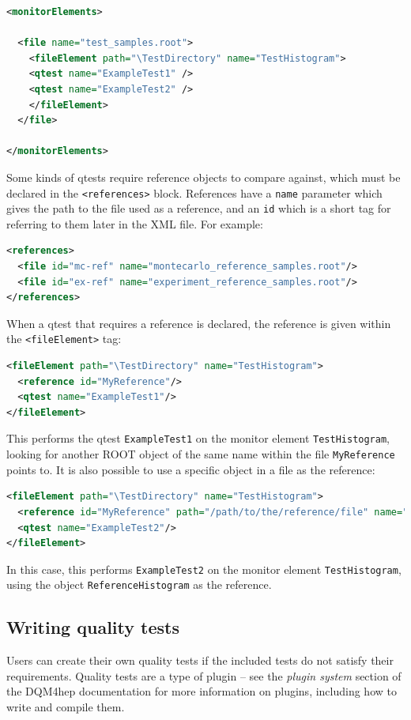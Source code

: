 \begin{lstlisting}[language=XML]
<monitorElements>

  <file name="test_samples.root">
    <fileElement path="\TestDirectory" name="TestHistogram">
    <qtest name="ExampleTest1" />
    <qtest name="ExampleTest2" />
    </fileElement>
  </file>

</monitorElements>
\end{lstlisting}

Some kinds of \acrshort{qtest}s require reference objects to compare against, which must be declared in the \texttt{<references>} block. References have a \texttt{name} parameter which gives the path to the file used as a reference, and an \texttt{id} which is a short tag for referring to them later in the XML file. For example:

\begin{lstlisting}[language=XML]
<references>
  <file id="mc-ref" name="montecarlo_reference_samples.root"/>
  <file id="ex-ref" name="experiment_reference_samples.root"/>
</references>
\end{lstlisting}

When a \acrshort{qtest} that requires a reference is declared, the reference is given within the \texttt{<fileElement>} tag:

\begin{lstlisting}[language=XML]
<fileElement path="\TestDirectory" name="TestHistogram">
  <reference id="MyReference"/>
  <qtest name="ExampleTest1"/>
</fileElement>
\end{lstlisting}

This performs the \acrshort{qtest} \texttt{ExampleTest1} on the monitor element \texttt{TestHistogram}, looking for another ROOT object of the same name within the file \texttt{MyReference} points to. It is also possible to use a specific object in a file as the reference:

\begin{lstlisting}[language=XML]
<fileElement path="\TestDirectory" name="TestHistogram">
  <reference id="MyReference" path="/path/to/the/reference/file" name="ReferenceHistogram"/>
  <qtest name="ExampleTest2"/>
</fileElement>
\end{lstlisting}

In this case, this performs \texttt{ExampleTest2} on the monitor element \texttt{TestHistogram}, using the object \texttt{ReferenceHistogram} as the reference. 

\subsection{Writing quality tests}
Users can create their own quality tests if the included tests do not satisfy their requirements. Quality tests are a type of plugin – see the \textit{plugin system} section of the \acrshort{DQM4hep} documentation \cite{dqm4hep-user-manual-plugins} for more information on plugins, including how to write and compile them.

